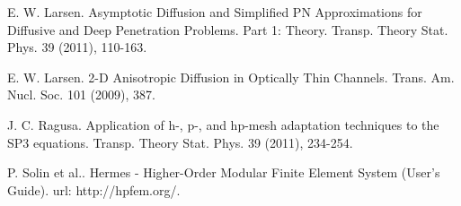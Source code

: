 
\begin{thebibliography}{10}

{\sc E. W. Larsen}. {Asymptotic Diffusion and Simplified PN Approximations for Diffusive and Deep Penetration Problems. Part 1: Theory}. Transp. Theory Stat. Phys. 39 (2011), 110-163.



{\sc E. W. Larsen}. {2-D Anisotropic Diffusion in Optically Thin Channels}. Trans. Am. Nucl. Soc. 101 (2009), 387.



{\sc J. C. Ragusa}. {Application of h-, p-, and hp-mesh adaptation techniques to the SP3 equations}. Transp. Theory Stat. Phys. 39 (2011), 234-254.



{\sc P. Solin et al.}. {Hermes - Higher-Order Modular Finite Element System (User's Guide)}. url: http://hpfem.org/.

\end{thebibliography}
